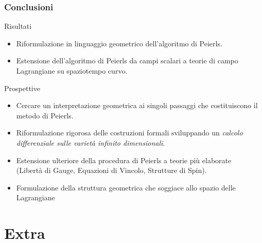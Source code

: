 \documentclass[8pt,handout]{beamer}
\begin{document}
		\begin{frame}
		\frametitle{ Conclusioni}
			\begin{block}{Risultati}
				\begin{itemize}
					\item Riformulazione in linguaggio geometrico dell'algoritmo di Peierls.
					\item Estensione dell'algoritmo di Peierls da campi scalari a teorie di campo Lagrangiane su spaziotempo curvo.
				\end{itemize}
			\end{block}
			\begin{block}{Prospettive}
				\begin{itemize}
					\item Cercare un interpretazione geometrica ai singoli passaggi che costituiscono il metodo di Peierls.
					\item Riformulazione rigorosa delle costruzioni formali sviluppando un \emph{calcolo differenziale sulle varietà infinito dimensionali}.
					\item Estensione ulteriore della procedura di Peierls a teorie più elaborate\\
					(Libertà di Gauge, Equazioni di Vincolo, Strutture di Spin).
					\item 	Formulazione della struttura geometrica che soggiace allo spazio delle Lagrangiane
					\end{itemize}				 
			\end{block}
	\end{frame}


	\section{Extra}
	\frame{\sectionpage}	
\end{document}
